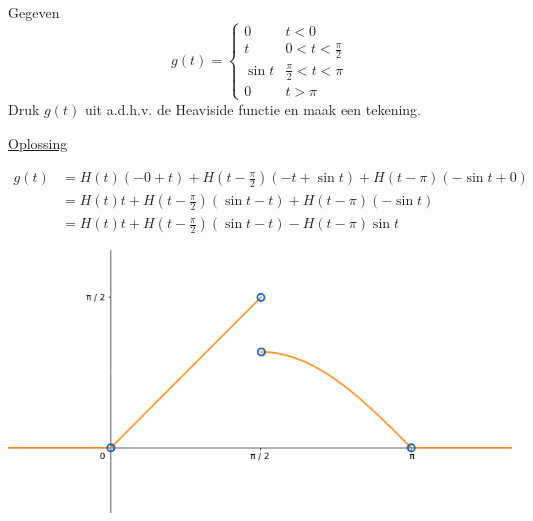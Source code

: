 \documentclass[12pt]{report}
\newcommand{\exercise}[2]{
  #1
  

  \underline{Oplossing}
  
  #2
  
  \hrulefill
}
\begin{document}
\exercise{Gegeven $$g(t) = \begin{cases}
                            0 & t < 0 \\
                            t &  0 < t < \frac{\pi}{2} \\
                            \sin t & \frac{\pi}{2} < t < \pi \\
                            0 & t > \pi         
                           \end{cases}
$$
Druk $g(t)$ uit a.d.h.v. de Heaviside functie en maak een tekening.}{
\begin{equation*}
 \begin{split}
  g(t) & = H(t)(-0 + t) + H(t - \frac{\pi}{2})(-t + \sin t) + H(t - \pi)(-\sin t + 0) \\
       & = H(t)t + H(t - \frac{\pi}{2})(\sin t - t) + H(t - \pi)(-\sin t) \\
       & = H(t)t + H(t - \frac{\pi}{2})(\sin t - t) - H(t - \pi)\sin t
 \end{split}
\end{equation*}
\begin{center}
 \includegraphics[width=\textwidth]{oef2_heaviside}
\end{center}
}
\end{document}
